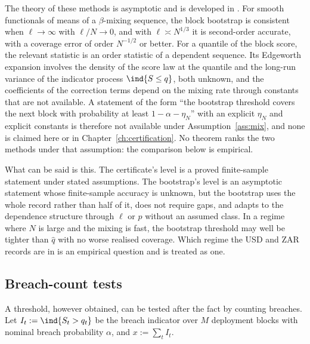 The theory of these methods is asymptotic and is developed in \cite{lahiri2003}. For smooth functionals of means of a $\beta$-mixing sequence, the block bootstrap is consistent when $\ell\to\infty$ with $\ell/N\to0$, and with $\ell\asymp N^{1/3}$ it is second-order accurate, with a coverage error of order $N^{-1/2}$ or better. For a quantile of the block score, the relevant statistic is an order statistic of a dependent sequence. Its Edgeworth expansion involves the density of the score law at the quantile and the long-run variance of the indicator process $\ind{S\le q}$, both unknown, and the coefficients of the correction terms depend on the mixing rate through constants that are not available. A statement of the form ``the bootstrap threshold covers the next block with probability at least $1-\alpha-\eta_N$'' with an explicit $\eta_N$ and explicit constants is therefore not available under Assumption~\ref{ass:mix}, and none is claimed here or in Chapter~\ref{ch:certification}. No theorem ranks the two methods under that assumption: the comparison below is empirical.

What can be said is this. The certificate's level is a proved finite-sample statement under stated assumptions. The bootstrap's level is an asymptotic statement whose finite-sample accuracy is unknown, but the bootstrap uses the whole record rather than half of it, does not require gaps, and adapts to the dependence structure through $\ell$ or $p$ without an assumed class. In a regime where $N$ is large and the mixing is fast, the bootstrap threshold may well be tighter than $\hat q$ with no worse realised coverage. Which regime the USD and ZAR records are in is an empirical question and is treated as one.

\subsection{Breach-count tests}

A threshold, however obtained, can be tested after the fact by counting breaches. Let $I_t:=\ind{S_t>q_t}$ be the breach indicator over $M$ deployment blocks with nominal breach probability $\alpha$, and $x:=\sum_tI_t$.

